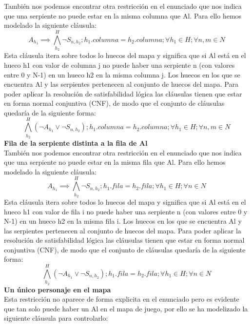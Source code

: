 \documentclass[11pt,spanish]{article}
\begin{document}
			También nos podemos encontrar otra restricción en el enunciado que nos indica que una serpiente no puede estar en la misma columna que Al. Para ello hemos modelado la siguiente cláusula:
			\begin{equation*}
				A_{h_1} \implies \bigwedge\limits_{h_2}^H \neg S_{n,h_2}; h_1.columna = h_2.columna; \forall h_1\in H; \forall n,m \in N
			\end{equation*}
			Esta cláusula itera sobre todos lo huecos del mapa y significa que si Al está en el hueco h1 con valor de columna j  no puede haber una serpiente n (con valores entre 0 y N-1) en un hueco h2  en la misma columna j. Los huecos en los que se encuentra Al y las serpientes pertenecen al conjunto de huecos del mapa. Para poder aplicar la resolución de satisfabilidad lógica las cláusulas tienen que estar en forma normal conjuntiva (CNF), de modo que el conjunto de cláusulas quedaría de la siguiente forma:
			\begin{equation*}
				\bigwedge\limits_{h_2}^H (\neg A_{h_1} \lor \neg S_{n,h_2}); h_1.columna = h_2.columna; \forall h_1\in H; \forall n,m \in N
			\end{equation*}
			\textbf{Fila de la serpiente distinta a la fila de Al}\\
			También nos podemos encontrar otra restricción en el enunciado que nos indica que una serpiente no puede estar en la misma fila que Al. Para ello hemos modelado la siguiente cláusula:
			\begin{equation*}
				A_{h_1} \implies \bigwedge\limits_{h_2}^H \neg S_{n,h_2}; h_1.fila = h_2.fila; \forall h_1\in H; \forall n\in N
			\end{equation*}
			Esta cláusula itera sobre todos lo huecos del mapa y significa que si Al está en el hueco h1 con valor de fila i  no puede haber una serpiente n (con valores entre 0 y N-1) en un hueco h2  en la misma fila i. Los huecos en los que se encuentra Al y las serpientes pertenecen al conjunto de huecos del mapa. Para poder aplicar la resolución de satisfabilidad lógica las cláusulas tienen que estar en forma normal conjuntiva (CNF), de modo que el conjunto de cláusulas quedaría de la siguiente forma:
			\begin{equation*}
				\bigwedge\limits_{h_2}^H (\neg A_{h_1} \lor \neg S_{n,h_2}); h_1.fila = h_2.fila; \forall h_1\in H; \forall n\in N
			\end{equation*}
			\textbf{Un único personaje en el mapa}\\
			Esta restricción no aparece de forma explicita en el enunciado pero es evidente que tan solo puede haber un Al en el mapa de juego, por ello se ha modelizado la siguiente cláusula para controlarlo:
\end{document}
